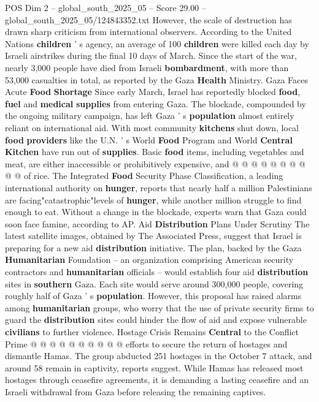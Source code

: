 \begin{textsample}{POS Dim 2 – global\_south\_2025\_05 – Score 29.00 – global\_south\_2025\_05/124843352.txt}
However, the scale of destruction has drawn sharp criticism from international observers.
According to the United Nations \textbf{children} ' s agency, an average of 100 \textbf{children} were killed each day by Israeli airstrikes during the final 10 days of March.
Since the start of the war, nearly 3,000 people have died from Israeli \textbf{bombardment}, with more than 53,000 casualties in total, as reported by the Gaza \textbf{Health} Ministry.
Gaza Faces Acute \textbf{Food} \textbf{Shortage} Since early March, Israel has reportedly blocked \textbf{food}, \textbf{fuel} and \textbf{medical} \textbf{supplies} from entering Gaza.
The blockade, compounded by the ongoing military campaign, has left Gaza ' s \textbf{population} almost entirely reliant on international aid.
With most community \textbf{kitchens} shut down, local \textbf{food} \textbf{providers} like the U.N. ' s World \textbf{Food} Program and World \textbf{Central} \textbf{Kitchen} have run out of \textbf{supplies}.
Basic \textbf{food} items, including vegetables and meat, are either inaccessible or prohibitively expensive, and @ @ @ @ @ @ @ @ @ @ of rice.
The Integrated \textbf{Food} Security Phase Classification, a leading international authority on \textbf{hunger}, reports that nearly half a million Palestinians are facing"catastrophic"levels of \textbf{hunger}, while another million struggle to find enough to eat.
Without a change in the blockade, experts warn that Gaza could soon face famine, according to AP.
Aid \textbf{Distribution} Plans Under Scrutiny The latest satellite images, obtained by The Associated Press, suggest that Israel is preparing for a new aid \textbf{distribution} initiative.
The plan, backed by the Gaza \textbf{Humanitarian} Foundation -- an organization comprising American security contractors and \textbf{humanitarian} officials -- would establish four aid \textbf{distribution} sites in \textbf{southern} Gaza.
Each site would serve around 300,000 people, covering roughly half of Gaza ' s \textbf{population}.
However, this proposal has raised alarms among \textbf{humanitarian} groups, who worry that the use of private security firms to guard the \textbf{distribution} sites could hinder the flow of aid and expose vulnerable \textbf{civilians} to further violence.
Hostage Crisis Remains \textbf{Central} to the Conflict Prime @ @ @ @ @ @ @ @ @ @ efforts to secure the return of hostages and dismantle Hamas.
The group abducted 251 hostages in the October 7 attack, and around 58 remain in captivity, reports suggest.
While Hamas has released most hostages through ceasefire agreements, it is demanding a lasting ceasefire and an Israeli withdrawal from Gaza before releasing the remaining captives.

\end{textsample}
